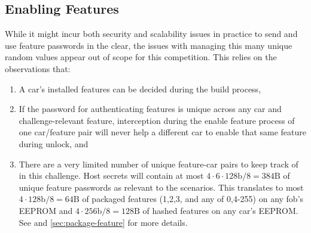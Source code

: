 \subsection{Enabling Features}

While it might incur both security and scalability issues in practice to send and use feature passwords \featpwd{\carid}{\featid} in the clear, the issues with managing this many unique random values appear out of scope for this competition. This relies on the observations that:
\begin{enumerate}
    \item A car's installed features can be decided during the build process,
    \item If the password for authenticating features is unique across any car and challenge-relevant feature, interception during the enable feature process of one car/feature pair will never help a different car to enable that same feature during unlock, and
    \item There are a very limited number of unique feature-car pairs to keep track of in this challenge. Host secrets will contain at most $4 \cdot 6 \cdot 128\text{b}/8 = 384\text{B}$ of unique feature passwords as relevant to the scenarios. This translates to most $4 \cdot 128\text{b}/8 = 64\text{B}$ of packaged features (1,2,3, and any of 0,4-255) on any fob's EEPROM and $4 \cdot 256\text{b}/8 = 128\text{B}$ of hashed features on any car's EEPROM. See  and \ref{sec:package-feature} for more details.%
\end{enumerate}